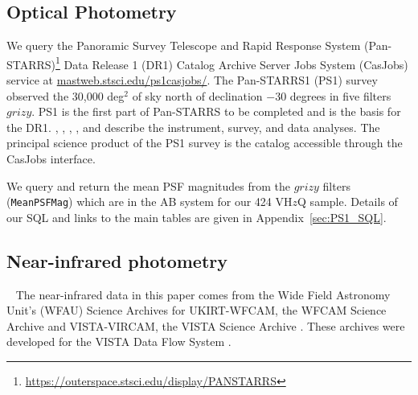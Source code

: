 \documentclass[usenatbib]{mnras}
\begin{document}
        
\subsection{Optical Photometry}
We query the Panoramic Survey Telescope and Rapid Response System
(Pan-STARRS)\footnote{\href{https://outerspace.stsci.edu/display/PANSTARRS}{https://outerspace.stsci.edu/display/PANSTARRS}}
Data Release 1 (DR1) Catalog Archive Server Jobs System (CasJobs)
service at
\href{http://mastweb.stsci.edu/ps1casjobs/}{mastweb.stsci.edu/ps1casjobs/}. The
Pan-STARRS1 (PS1) survey observed the 30,000 deg$^{2}$ of sky north of
declination $-30$ degrees in five filters $grizy$.  PS1 is the first
part of Pan-STARRS to be completed and is the basis for the DR1.
\citet{Chambers2016}, \citet{Magnier2016a}, \citet{Waters2016},
\citet{Magnier2016b}, \citet{Magnier2016c} and \citet{Flewelling2016}
describe the instrument, survey, and data analyses.  The principal
science product of the PS1 survey is the catalog accessible through
the CasJobs interface.
    
We query and return the mean PSF magnitudes from the $grizy$ filters
({\tt MeanPSFMag}) which are in the AB system for our 424 VH$z$Q
sample. Details of our SQL and links to the main tables are given in
Appendix~\ref{sec:PS1_SQL}.
    
    \iffalse
    \subsubsection{DECam} 
    The Dark Energy Camera \citep[DECam][]{Flaugher2015} is 
    is a wide-field imager with a 2.2 degree diameter field of view 
    mounted at the prime focus of the Victor M. Blanco 4 m telescope 
    at the Cerro Tololo International Observatory. We use data 
    from both the Dark Energy Survey \citep[DES; ][]{DES2016} and 
    the DESI Legacy Imaging Survey \citep[DECaLS; ][]{Dey2018}. 
    \fi
    

\subsection{Near-infrared photometry}~\label{sec:NIR_data} 
The near-infrared data in this paper comes from the Wide Field Astronomy Unit's
(WFAU) Science Archives for UKIRT-WFCAM, the WFCAM Science Archive
\citep[WSA][]{WSA} and VISTA-VIRCAM, the VISTA Science Archive
\citep[VSA][]{VSA}. These archives were developed for the VISTA Data Flow System
\citep[VDFS][]{VDFS}.
\end{document}
